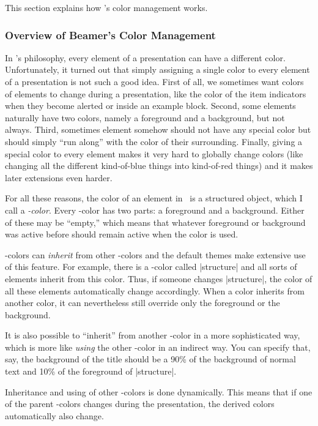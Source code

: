 This section explains how \beamer's color management works.



\subsubsection{Overview of Beamer's Color Management}

In \beamer's philosophy, every element of a presentation can have a
different color. Unfortunately, it turned out that simply assigning a
single color to every element of a presentation is not such a good
idea. First of all, we sometimes  want colors of elements to change
during a presentation, like the color of the item indicators when they
become alerted or inside an example block. Second, some elements
naturally have two colors, namely a foreground and a background, but
not always. Third, sometimes element somehow should not have any
special color but should simply ``run along'' with the color of their
surrounding. Finally, giving a special color to every element makes it
very hard to globally change colors (like changing all the different
kind-of-blue things into kind-of-red things) and it makes later
extensions even harder.

For all these reasons, the color of an element in \beamer\ is a
structured object, which I call a \emph{\beamer-color}. Every
\beamer-color has two parts: a foreground and a background. Either of
these may be ``empty,'' which means that whatever foreground or
background was active before should remain active when the color is
used.

\beamer-colors can \emph{inherit} from other \beamer-colors and the
default themes make extensive use of this feature. For example, there
is a \beamer-color called |structure| and all sorts of elements
inherit from this color. Thus, if someone changes |structure|, the
color of all these elements automatically change accordingly. When a
color inherits from another color, it can nevertheless still override
only the foreground or the background.

It is also possible to ``inherit'' from another \beamer-color in a more
sophisticated way, which is more like \emph{using} the other
\beamer-color in an indirect way. You can specify that, say, the
background of the title should be a 90\% of the background of normal
text and 10\% of the foreground of |structure|.

Inheritance and using of other \beamer-colors is done
dynamically. This means that if one of the parent \beamer-colors
changes during the presentation, the derived colors automatically also
change.

